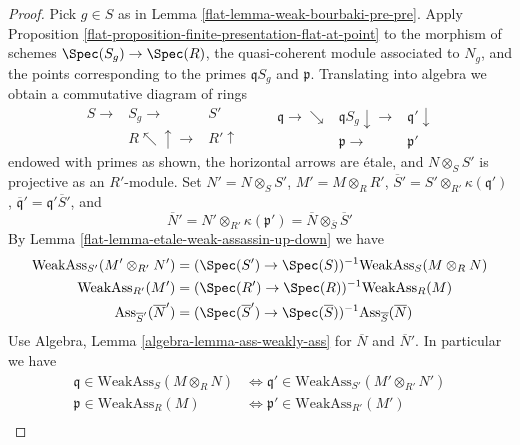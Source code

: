 \begin{proof}

Pick $g \in S$ as in Lemma \ref{flat-lemma-weak-bourbaki-pre-pre}.
Apply Proposition \ref{flat-proposition-finite-presentation-flat-at-point}
to the morphism of schemes $\Spec(S_g) \to \Spec(R)$, the quasi-coherent
module associated to $N_g$, and the points
corresponding to the primes $\mathfrak qS_g$ and $\mathfrak p$. Translating
into algebra we obtain a commutative diagram of rings
$$
\begin{array}{ccc}S \longrightarrow & S_g \longrightarrow & S' \\  & R \nwarrow\uparrow\longrightarrow & R' \uparrow\end{array}
\quad\quad
\begin{array}{ccc}\mathfrak q \longrightarrow\searrow & \mathfrak qS_g \downarrow\longrightarrow & \mathfrak q' \downarrow \\  & \mathfrak p \longrightarrow & \mathfrak p'\end{array}
$$
endowed with primes as shown, the horizontal arrows are \'etale,
and $N \otimes_S S'$ is projective as an $R'$-module. Set
$N' = N \otimes_S S'$, $M' = M \otimes_R R'$,
$\overline{S}' = S' \otimes_{R'} \kappa(\mathfrak q')$,
$\overline{\mathfrak q}' = \mathfrak q' \overline{S}'$,
and
$$
\overline{N}' = N' \otimes_{R'} \kappa(\mathfrak p') =
\overline{N} \otimes_{\overline{S}} \overline{S}'
$$
By Lemma \ref{flat-lemma-etale-weak-assassin-up-down} we have
\begin{align*}
\text{WeakAss}_{S'}(M' \otimes_{R'} N') & =
(\Spec(S') \to \Spec(S))^{-1}\text{WeakAss}_S(M \otimes_R N) \\
\text{WeakAss}_{R'}(M') & =
(\Spec(R') \to \Spec(R))^{-1}\text{WeakAss}_R(M) \\
\text{Ass}_{\overline{S}'}(\overline{N}') & =
(\Spec(\overline{S}') \to \Spec(\overline{S}))^{-1}
\text{Ass}_{\overline{S}}(\overline{N})
\end{align*}
Use Algebra, Lemma \ref{algebra-lemma-ass-weakly-ass}
for $\overline{N}$ and $\overline{N}'$. In particular we have
\begin{align*}
\mathfrak q \in \text{WeakAss}_S(M \otimes_R N)
& \Leftrightarrow
\mathfrak q' \in \text{WeakAss}_{S'}(M' \otimes_{R'} N') \\
\mathfrak p \in \text{WeakAss}_R(M)
& \Leftrightarrow
\mathfrak p' \in \text{WeakAss}_{R'}(M') \\

\end{align*}
\end{proof}
